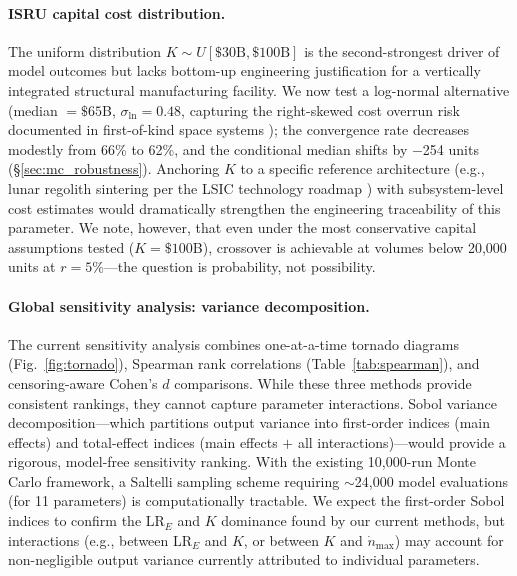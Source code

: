 \documentclass[preprint,12pt]{elsarticle}
\begin{document}
\paragraph{ISRU capital cost distribution.} The uniform distribution $K \sim U[\$30\text{B}, \$100\text{B}]$ is the second-strongest driver of model outcomes but lacks bottom-up engineering justification for a vertically integrated structural manufacturing facility. We now test a log-normal alternative (median $= \$65$B, $\sigma_{\ln} = 0.48$, capturing the right-skewed cost overrun risk documented in first-of-kind space systems \cite{wertz2011}); the convergence rate decreases modestly from 66\% to 62\%, and the conditional median shifts by $-$254 units (\S\ref{sec:mc_robustness}). Anchoring $K$ to a specific reference architecture (e.g., lunar regolith sintering per the LSIC technology roadmap \cite{lsic2021}) with subsystem-level cost estimates would dramatically strengthen the engineering traceability of this parameter. We note, however, that even under the most conservative capital assumptions tested ($K = \$100$B), crossover is achievable at volumes below 20{,}000 units at $r = 5\%$---the question is probability, not possibility.

\paragraph{Global sensitivity analysis: variance decomposition.} The current sensitivity analysis combines one-at-a-time tornado diagrams (Fig.~\ref{fig:tornado}), Spearman rank correlations (Table~\ref{tab:spearman}), and censoring-aware Cohen's $d$ comparisons. While these three methods provide consistent rankings, they cannot capture parameter interactions. Sobol variance decomposition---which partitions output variance into first-order indices (main effects) and total-effect indices (main effects $+$ all interactions)---would provide a rigorous, model-free sensitivity ranking. With the existing 10{,}000-run Monte Carlo framework, a Saltelli sampling scheme requiring $\sim$24{,}000 model evaluations (for 11 parameters) is computationally tractable. We expect the first-order Sobol indices to confirm the LR$_E$ and $K$ dominance found by our current methods, but interactions (e.g., between LR$_E$ and $K$, or between $K$ and $\dot{n}_{\max}$) may account for non-negligible output variance currently attributed to individual parameters.
\end{document}
